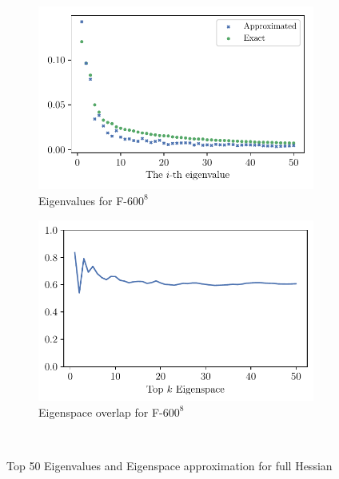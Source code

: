 \begin{figure}[H]
\begin{subfigure}[t]{0.5\textwidth}
        \includegraphics[width=\textwidth]{Appendix_Figures/Full_hessian/newplots/eigenval_fc8_600.pdf}
        \caption{Eigenvalues for F-$600^8$}
    \end{subfigure}%
    \begin{subfigure}[t]{0.5\textwidth}
        \centering
        \captionsetup{justification=centering}
        \includegraphics[width=\textwidth]{Appendix_Figures/Full_hessian/newplots/eigenvec_fc8_600.pdf}
        \caption{Eigenspace overlap for F-$600^8$}
    \end{subfigure}\\
    \caption{Top 50 Eigenvalues and Eigenspace approximation for full Hessian}
    \label{fig:Corrfc11}
\end{figure}
